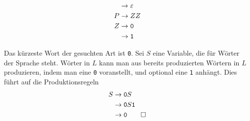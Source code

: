 \begin{loesung}
\begin{teilaufgaben}
\begin{align*}
 &\rightarrow \varepsilon\\
P&\rightarrow ZZ\\
Z&\rightarrow {\tt 0}\\
 &\rightarrow {\tt 1}
\end{align*}
\item
Das kürzeste Wort der gesuchten Art ist {\tt 0}. Sei $S$ eine
Variable, die für Wörter der Sprache steht. Wörter in $L$
kann man aus bereits produzierten Wörtern in $L$ produzieren,
indem man  eine {\tt 0} voranstellt, und optional eine {\tt 1}
anhängt. Dies führt auf die Produktionsregeln
\begin{align*}
S&\rightarrow {\tt 0}S\\
 &\rightarrow {\tt 0}S{\tt 1}\\
 &\rightarrow {\tt 0}
\qedhere
\end{align*}
\end{teilaufgaben}
\end{loesung}
